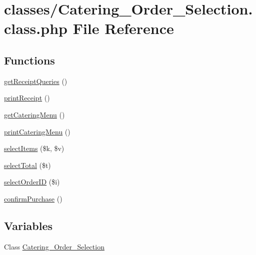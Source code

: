 \hypertarget{_catering___order___selection_8class_8php}{}\section{classes/\+Catering\+\_\+\+Order\+\_\+\+Selection.class.\+php File Reference}
\label{_catering___order___selection_8class_8php}
\subsection*{Functions}
\begin{DoxyCompactItemize}
\item 
\mbox{\hyperlink{_catering___order___selection_8class_8php_afea91457e1886d995f1a6de7439ceaeb}{get\+Receipt\+Queries}} ()
\item 
\mbox{\hyperlink{_catering___order___selection_8class_8php_a3b05a1e41412a6594da4671a32eb73cd}{print\+Receipt}} ()
\item 
\mbox{\hyperlink{_catering___order___selection_8class_8php_a556c7043d3b316ccab6e46f531abec7f}{get\+Catering\+Menu}} ()
\item 
\mbox{\hyperlink{_catering___order___selection_8class_8php_a5ecee293792f53af2de419b50195e5fd}{print\+Catering\+Menu}} ()
\item 
\mbox{\hyperlink{_catering___order___selection_8class_8php_ab30920ac61f282a414092277587a25a1}{select\+Items}} (\$k, \$v)
\item 
\mbox{\hyperlink{_catering___order___selection_8class_8php_a8479e007f854c94229714a8425c5b6c0}{select\+Total}} (\$t)
\item 
\mbox{\hyperlink{_catering___order___selection_8class_8php_ad8c931daea4616337e35d0add407efa0}{select\+Order\+ID}} (\$i)
\item 
\mbox{\hyperlink{_catering___order___selection_8class_8php_a539ea0c001b23b8d52ffadcec3bc3174}{confirm\+Purchase}} ()
\end{DoxyCompactItemize}
\subsection*{Variables}
\begin{DoxyCompactItemize}
\item 
Class \mbox{\hyperlink{_catering___order___selection_8class_8php_aebb6021aa7a5316a9d74c95e0314bd1e}{Catering\+\_\+\+Order\+\_\+\+Selection}}
\end{DoxyCompactItemize}


